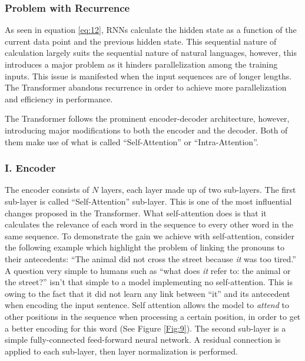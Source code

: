 
\subsubsection{Problem with Recurrence} 
\label{bg:subsub11}
As seen in equation \ref{eq:12}, \ac{RNN}s calculate the hidden state as a function of the current data point and the previous hidden state. This sequential nature of calculation largely suits the sequential nature of natural languages, however, this introduces a major problem as it hinders parallelization among the training inputs. This issue is manifested when the input sequences are of longer lengths. The Transformer abandons recurrence in order to achieve more parallelization and efficiency in performance.




The Transformer follows the prominent encoder-decoder architecture, however, introducing major modifications to both the encoder and the decoder. Both of them make use of what is called \enquote{Self-Attention} or \enquote{Intra-Attention}.


\subsubsection{I. Encoder} 
\label{bg:subsub12}

The encoder consists of $N$ layers, each layer made up of two sub-layers. The first sub-layer is called  \enquote{Self-Attention} sub-layer. This is one of the most influential changes proposed in the Transformer. 
What self-attention does is that it calculates the relevance of each word in the sequence to every other word in the same sequence. 
To demonstrate the gain we achieve with self-attention, consider the following example which highlight the problem of linking the pronouns to their antecedents: \enquote{The animal did not cross the street because \textit{it} was too tired.} A question very simple to humans such as \enquote{what does \textit{it} refer to: the animal or the street?} isn't that simple to a model implementing no self-attention. 
This is owing to the fact that it did not learn any link between \enquote{it} and its antecedent when encoding the input sentence.
Self attention allows the model to \textit{attend} to other positions in the sequence when processing a certain position, in order to get a better encoding for this word (See Figure \ref{Fig:9}). 
The second sub-layer is a simple fully-connected feed-forward neural network. A residual connection \cite{he2016deep} is applied to each sub-layer, then layer normalization \cite{ba2016layer} is performed.


